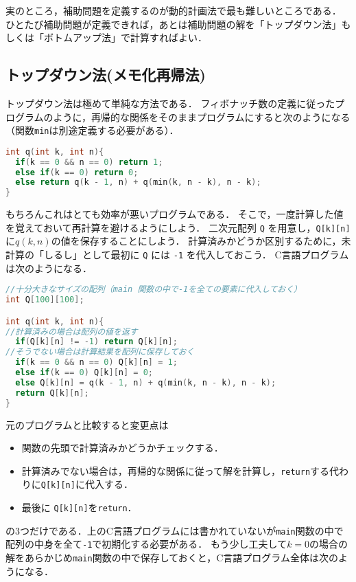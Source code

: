 \documentclass[a4paper,twoside,onecolumn,openany,article]{memoir}
\theoremstyle{remark}
\begin{document}
実のところ，補助問題を定義するのが動的計画法で最も難しいところである．
ひとたび補助問題が定義できれば，あとは補助問題の解を「トップダウン法」もしくは「ボトムアップ法」で計算すればよい．

\subsection{トップダウン法(メモ化再帰法)}
トップダウン法は極めて単純な方法である．
フィボナッチ数の定義に従ったプログラムのように，再帰的な関係をそのままプログラムにすると次のようになる（関数\texttt{min}は別途定義する必要がある）．

\begin{lstlisting}[basicstyle=\ttfamily\small,showstringspaces=false,language=C,frame=single]
int q(int k, int n){
  if(k == 0 && n == 0) return 1;
  else if(k == 0) return 0;
  else return q(k - 1, n) + q(min(k, n - k), n - k);
}
\end{lstlisting}
もちろんこれはとても効率が悪いプログラムである．
そこで，一度計算した値を覚えておいて再計算を避けるようにしよう．
二次元配列 \texttt{Q} を用意し，\texttt{Q[k][n]} に$q(k, n)$の値を保存することにしよう．
計算済みかどうか区別するために，未計算の「しるし」として最初に \texttt{Q} には \texttt{-1} を代入しておこう．
C言語プログラムは次のようになる．
\begin{lstlisting}[basicstyle=\ttfamily\small,showstringspaces=false,language=C,frame=single]
//十分大きなサイズの配列（main 関数の中で-1を全ての要素に代入しておく）
int Q[100][100];

int q(int k, int n){
//計算済みの場合は配列の値を返す
  if(Q[k][n] != -1) return Q[k][n];
//そうでない場合は計算結果を配列に保存しておく
  if(k == 0 && n == 0) Q[k][n] = 1;
  else if(k == 0) Q[k][n] = 0;
  else Q[k][n] = q(k - 1, n) + q(min(k, n - k), n - k);
  return Q[k][n];
}
\end{lstlisting}
元のプログラムと比較すると変更点は
\begin{itemize}
\item 関数の先頭で計算済みかどうかチェックする．
\item 計算済みでない場合は，再帰的な関係に従って解を計算し，\texttt{return}する代わりに\texttt{Q[k][n]}に代入する．
\item 最後に \texttt{Q[k][n]}を\texttt{return}．
\end{itemize}
の3つだけである．上のC言語プログラムには書かれていないが\texttt{main}関数の中で配列の中身を全て\texttt{-1}で初期化する必要がある．
もう少し工夫して$k=0$の場合の解をあらかじめ\texttt{main}関数の中で保存しておくと，C言語プログラム全体は次のようになる．
\end{document}
